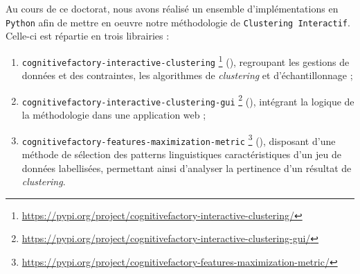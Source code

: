 \DontFrameThisInToc
{}
\label{annex:C-ANNEXE-IMPLEMENTATIONS}

	Au cours de ce doctorat, nous avons réalisé un ensemble d'implémentations en \texttt{Python} afin de mettre en oeuvre notre méthodologie de \texttt{Clustering Interactif}.
	Celle-ci est répartie en trois librairies :
	\begin{enumerate}
		\item \texttt{cognitivefactory-interactive-clustering} \footnote{
			\url{https://pypi.org/project/cognitivefactory-interactive-clustering/}
		} (\cite{schild:2022:cognitivefactory-interactiveclustering}), regroupant les gestions de données et des contraintes, les algorithmes de \textit{clustering} et d'échantillonnage ;
		\item \texttt{cognitivefactory-interactive-clustering-gui} \footnote{
			\url{https://pypi.org/project/cognitivefactory-interactive-clustering-gui/}
		} (\cite{schild-etal:2022:cognitivefactory-interactiveclusteringgui}), intégrant la logique de la méthodologie dans une application web ;
		\item \texttt{cognitivefactory-features-maximization-metric} \footnote{
			\url{https://pypi.org/project/cognitivefactory-features-maximization-metric/}
		} (\cite{schild:2023:cognitivefactory-featuresmaximizationmetric}), disposant d'une méthode de sélection des patterns linguistiques caractéristiques d'un jeu de données labellisées, permettant ainsi d'analyser la pertinence d'un résultat de \textit{clustering}.
	\end{enumerate}
	
